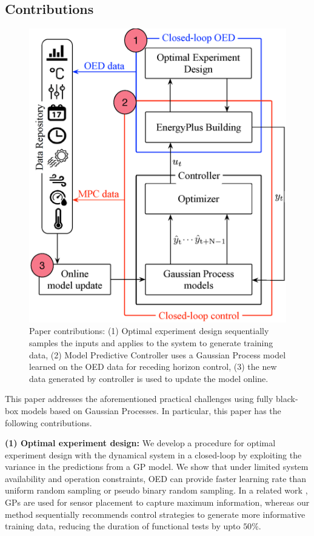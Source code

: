 \subsection{Contributions}
\begin{figure}[!t]
	\centering
	\includegraphics[width=0.7\linewidth]{figures/overview.eps}
	\caption{Paper contributions: (1) Optimal experiment design sequentially samples the inputs and applies to the system to generate training data, (2) Model Predictive Controller uses a Gaussian Process model learned on the OED data for receding horizon control, (3) the new data generated by controller is used to update the model online.}
	\captionsetup{justification=centering}
	\label{F:intro}
\end{figure}
This paper addresses the aforementioned practical challenges using fully black-box models based on Gaussian Processes.
In particular, this paper has the following contributions.

\noindent \textbf{(1) Optimal experiment design:} We develop a procedure for optimal experiment design with the dynamical system in a closed-loop by exploiting the variance in the predictions from a GP model. We show that under limited system availability and operation constraints, OED can provide faster learning rate than uniform random sampling or pseudo binary random sampling. In a related work \cite{Krause2008}, GPs are used for sensor placement to capture maximum information, whereas our method sequentially recommends control strategies to generate more informative training data, reducing the duration of functional tests by upto \(50\%\).
	
